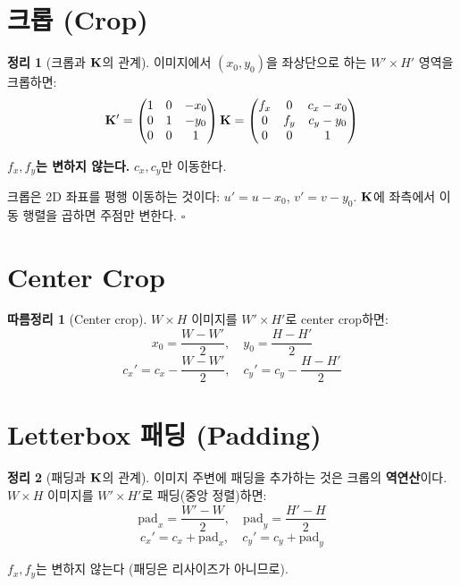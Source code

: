\documentclass[11pt, a4paper]{report}
\theoremstyle{definition}
\newtheorem{theorem}{정리}[chapter]
\newtheorem{corollary}{따름정리}[chapter]
\theoremstyle{remark}
\begin{document}
\section{크롭 (Crop)}

\begin{theorem}[크롭과 $\mathbf{K}$의 관계]
\label{thm:crop}
이미지에서 $(x_0, y_0)$을 좌상단으로 하는 $W' \times H'$ 영역을 크롭하면:
\begin{equation}
\mathbf{K}' = \begin{pmatrix} 1 & 0 & -x_0 \\ 0 & 1 & -y_0 \\ 0 & 0 & 1 \end{pmatrix} \mathbf{K}
= \begin{pmatrix} f_x & 0 & c_x - x_0 \\ 0 & f_y & c_y - y_0 \\ 0 & 0 & 1 \end{pmatrix}
\label{eq:crop_K}
\end{equation}

\textbf{$f_x, f_y$는 변하지 않는다.} $c_x, c_y$만 이동한다.
\end{theorem}

\begin{proofbox}
크롭은 2D 좌표를 평행 이동하는 것이다: $u' = u - x_0$, $v' = v - y_0$.
$\mathbf{K}$에 좌측에서 이동 행렬을 곱하면 주점만 변한다. $\square$
\end{proofbox}


\section{Center Crop}

\begin{corollary}[Center crop]
$W \times H$ 이미지를 $W' \times H'$로 center crop하면:
\begin{equation}
x_0 = \frac{W - W'}{2}, \quad y_0 = \frac{H - H'}{2}
\end{equation}
\begin{equation}
c_x' = c_x - \frac{W - W'}{2}, \quad c_y' = c_y - \frac{H - H'}{2}
\label{eq:center_crop}
\end{equation}
\end{corollary}


\section{Letterbox 패딩 (Padding)}

\begin{theorem}[패딩과 $\mathbf{K}$의 관계]
\label{thm:padding}
이미지 주변에 패딩을 추가하는 것은 크롭의 \textbf{역연산}이다.
$W \times H$ 이미지를 $W' \times H'$로 패딩(중앙 정렬)하면:
\begin{equation}
\text{pad}_x = \frac{W' - W}{2}, \quad \text{pad}_y = \frac{H' - H}{2}
\end{equation}
\begin{equation}
c_x' = c_x + \text{pad}_x, \quad c_y' = c_y + \text{pad}_y
\label{eq:padding_K}
\end{equation}

$f_x, f_y$는 변하지 않는다 (패딩은 리사이즈가 아니므로).
\end{theorem}
\end{document}
